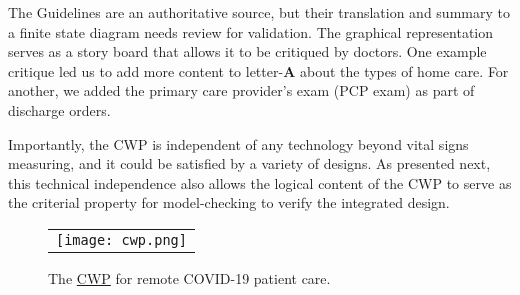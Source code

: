 The Guidelines are an authoritative source, but their translation and summary to a finite state diagram needs review for validation. 
The graphical representation serves as a story board that allows it to be critiqued by doctors. 
One example critique led us to add more content to letter-\textbf{A} about the types of home care.  
For another, we added the primary care provider's exam (PCP exam) as part of discharge orders.

Importantly, the CWP is independent of any technology beyond vital signs measuring, and it could be satisfied by a variety of designs.  
As presented next, this technical independence also allows the logical content of the CWP to serve as the criterial property for model-checking to verify the integrated design.

\begin{figure}[t]
  \begin{center}
    \begin{tabular}{c}
      \texttt{[image: cwp.png]}
    \end{tabular}
  \end{center}
\caption{The \href{https://github.com/ericmercer/SPIN-bpmn-cwp-verification-paper/blob/main/26-Oct-2021-CWP.png}{CWP} for remote COVID-19 patient care.}
\label{fig:cwp}
\end{figure}
